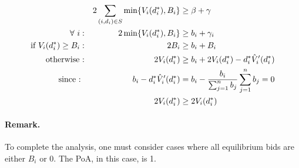 \documentclass[11pt,a4paper]{article}
\begin{document}
\begin{align*}
	&& 2\sum_{(i,d_{i}) \in S} \min\{V_i(d_i^*), B_i \} &\ge \beta + \gamma\\
	\forall\ i : && 2 \min\{V_i(d_i^*), B_i \} &\ge b_i + \gamma_i \\
	\textnormal{if } V_i(d_i^*) \ge B_i : && 2B_i &\ge b_i + B_i\\
	\textnormal{otherwise :} && 2 V_i(d_i^*) &\ge b_i + 2 V_{i}(d^{*}_{i}) - d^{*}_{i} \hat{V}'_{i}(d^{*}_{i})\\
	\textnormal{since : } && b_i - d^{*}_{i} \hat{V}'_{i}(d^{*}_{i}) &= b_i - \frac{b_i}{\sum_{j=1}^{n} b_j} \sum_{j=1}^{n} b_j = 0\\
	&& 2 V_{i}(d^{*}_{i}) &\ge 2 V_{i}(d^{*}_{i})
\end{align*}

\paragraph{Remark.} To complete the analysis, one must consider cases where all equilibrium bids are either $B_{i}$ or 0. The PoA, in this case, is 1.
\end{document}

